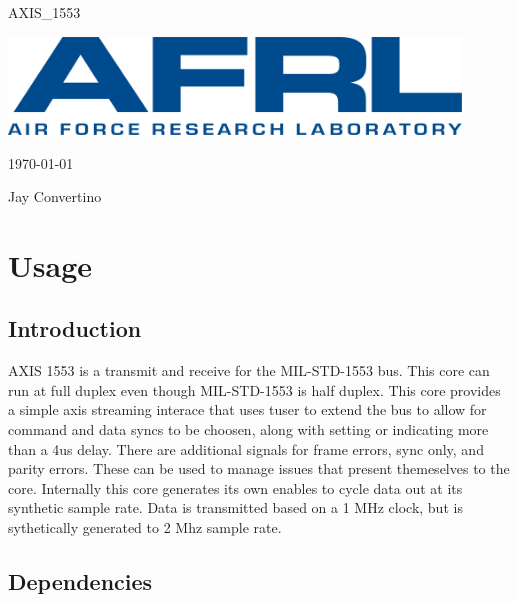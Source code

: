 \begin{titlepage}
  \begin{center}

  {\Huge AXIS\_1553}

  \vspace{25mm}

  \includegraphics[width=0.90\textwidth,height=\textheight,keepaspectratio]{img/AFRL.png}

  \vspace{25mm}

  \today

  \vspace{15mm}

  {\Large Jay Convertino}

  \end{center}
\end{titlepage}

\tableofcontents

\newpage

\section{Usage}

\subsection{Introduction}

\par
AXIS 1553 is a transmit and receive for the MIL-STD-1553 bus. This core can run at full duplex even though
MIL-STD-1553 is half duplex. This core provides a simple axis streaming interace that uses tuser to extend the
bus to allow for command and data syncs to be choosen, along with setting or indicating more than a 4us delay. 
There are additional signals for frame errors, sync only, and parity errors. These can be used to manage issues
that present themeselves to the core. Internally this core generates its own enables to cycle data out at its 
synthetic sample rate. Data is transmitted based on a 1 MHz clock, but is sythetically generated to 2 Mhz sample rate.

\subsection{Dependencies}


